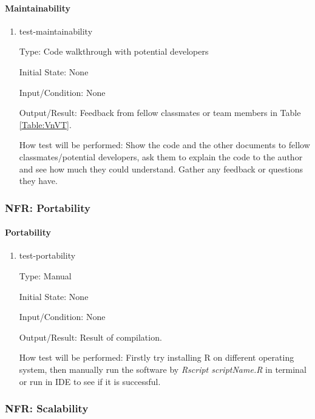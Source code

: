 \documentclass[12pt, titlepage]{article}
\begin{document}
\paragraph{Maintainability}

\begin{enumerate}

\item{test-maintainability}

Type: Code walkthrough with potential developers
					
Initial State: None
					
Input/Condition: None
					
Output/Result: Feedback from fellow classmates or team members in Table \ref{Table:VnVT}.				
	
How test will be performed: Show the code and the other documents to fellow classmates/potential developers, ask them to explain the code to the author and see how much they could understand. Gather any feedback or questions they have.
\end{enumerate}

		
\subsubsection{NFR: Portability}\label{t_portability}
		
\paragraph{Portability}

\begin{enumerate}

\item{test-portability}

Type: Manual
					
Initial State: None
					
Input/Condition: None
					
Output/Result: Result of compilation.
					
How test will be performed: Firstly try installing R on different operating system, then manually run the software by \textit{Rscript scriptName.R} in terminal or run in IDE to see if it is successful.

\end{enumerate}
		
\subsubsection{NFR: Scalability}\label{t_scalability}
		
\end{document}
